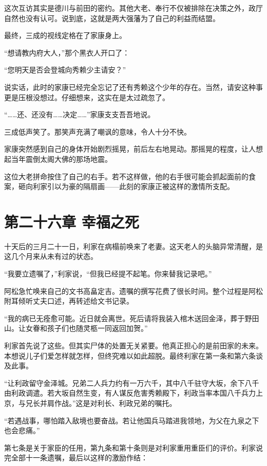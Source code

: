\documentclass[
]{book}
\begin{document}
这次互访其实是德川与前田的密约。其他大老、奉行不仅被排除在决策之外，政厅自然也没有认可。说到底，这就是两大强藩为了自己的利益而结盟。

最终，三成的视线定格在了家康身上。

``想请教内府大人，''那个黑衣人开口了：

``您明天是否会登城向秀赖少主请安？''

说实话，此时的家康已经完全忘记了还有秀赖这个少年的存在。当然，请安这种事更是压根没想过。仔细想来，这实在是太过疏忽了。

``\ldots\ldots 还、还没有\ldots\ldots 决定\ldots\ldots{}''家康支支吾吾地说。

三成低声笑了。那笑声充满了嘲讽的意味，令人十分不快。

家康突然感到自己的身体开始剧烈摇晃，前后左右地晃动。那摇晃的程度，让人想起当年震倒太阁大佛的那场地震。

这位大老拼命按住了自己的右手。若不这样做，他的右手很可能会抓起面前的食案，砸向利家引以为豪的隔扇画------此刻的家康正被这样的激情所支配。

\chapter*{第二十六章 幸福之死}\label{ux7b2cux4e8cux5341ux516dux7ae0-ux5e78ux798fux4e4bux6b7b}

十天后的三月二十一日，利家在病榻前唤来了老妻。这天老人的头脑异常清醒，是这几个月来从未有过的状态。

``我要立遗嘱了，''利家说，``但我已经提不起笔。你来替我记录吧。''

阿松急忙唤来自己的文书高畠定吉。遗嘱的撰写花费了很长时间。整个过程是阿松附耳倾听丈夫口述，再转述给文书记录。

``我的病已无痊愈可能。近日就会离世。死后请将我装入棺木送回金泽，葬于野田山。让女眷和孩子们也随灵柩一同返回加贺。''

利家首先说了这些。但其实尸体的处置无关紧要。他真正担心的是前田家的未来。本想说儿子们爱怎样就怎样，但终究难以如此超脱。最终利家在第一条和第六条谈及此事。

``让利政留守金泽城。兄弟二人兵力约有一万六千，其中八千驻守大坂，余下八千由利政调遣。若大坂自然生变，有人谋反危害秀赖殿下，利政当率本国八千兵力上京，与兄长并肩作战。''这是对利长、利政兄弟的嘱托。

``若遇战事，哪怕踏入敌境也要奋战。若让他国兵马踏进我领地，为父在九泉之下也会悲痛。''

第七条是关于家臣的任用，第九条和第十条则是对利家重用重臣们的评价。利家说完全部十一条遗嘱，最后以这样的激励作结：
\end{document}
